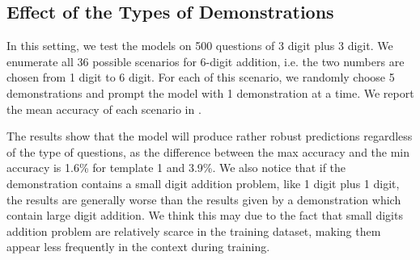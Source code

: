 

\subsection{Effect of the Types of Demonstrations}

In this setting, we test the models on 500 questions of 3 digit plus 3 digit. We enumerate all 36 possible scenarios for 6-digit addition, i.e. the two numbers are chosen from 1 digit to 6 digit. For each of this scenario, we randomly choose 5 demonstrations and prompt the model with 1 demonstration at a time. We report the mean accuracy of each scenario in .

The results show that the model will produce rather robust predictions regardless of the type of questions, as the difference between the max accuracy and the min accuracy is 1.6\% for template 1 and 3.9\%. We also notice that if the demonstration contains a small digit addition problem, like 1 digit plus 1 digit, the results are generally worse than the results given by a demonstration which contain large digit addition. We think this may due to the fact that small digits addition problem are relatively scarce in the training dataset, making them appear less frequently in the context during training. 


